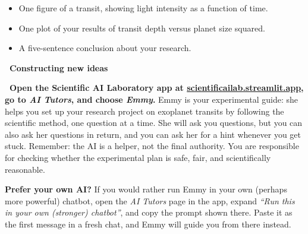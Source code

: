 \documentclass[12pt]{article}
\newcounter{question}
\begin{document}
\begin{itemize}
    \item One figure of a transit, showing light intensity as a function of time.
    \item One plot of your results of transit depth versus planet size squared.
    \item A five-sentence conclusion about your research.
\end{itemize}

\vspace{0.5cm}
\textcolor{accentcolor}{\textbf{\faLightbulb\ Constructing new ideas}}

\textcolor{maincolor}{\textbf{\faPen\ Open the Scientific AI Laboratory app at \href{https://scientificailab.streamlit.app}{scientificailab.streamlit.app}, go to \emph{AI Tutors}, and choose \emph{Emmy}.}} Emmy is your experimental guide: she helps you set up your research project on exoplanet transits by following the scientific method, one question at a time. She will ask you questions, but you can also ask her questions in return, and you can ask her for a hint whenever you get stuck. Remember: the AI is a helper, not the final authority. You are responsible for checking whether the experimental plan is safe, fair, and scientifically reasonable.

\begin{importantbox}
\textbf{Prefer your own AI?} If you would rather run Emmy in your own (perhaps more powerful) chatbot, open the \emph{AI Tutors} page in the app, expand \emph{``Run this in your own (stronger) chatbot''}, and copy the prompt shown there. Paste it as the first message in a fresh chat, and Emmy will guide you from there instead.
\end{importantbox}
\end{document}
